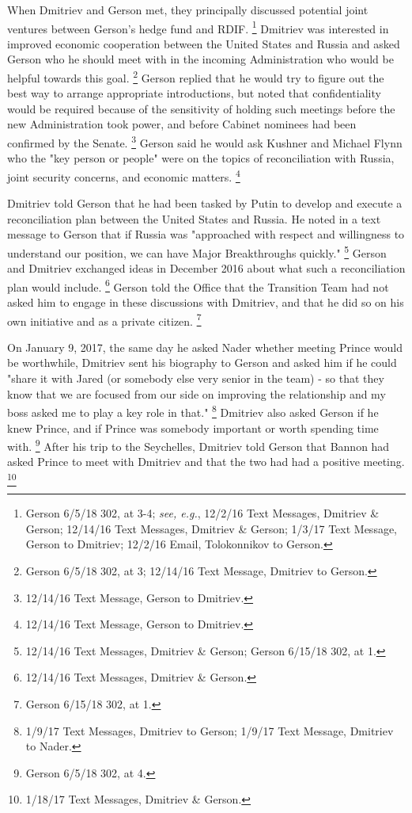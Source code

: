 When Dmitriev and Gerson met, they principally discussed potential joint ventures between Gerson's hedge fund and RDIF.%
\footnote{Gerson 6/5/18 302, at 3-4;
\textit{see, e.g.}, 12/2/16 Text Messages, Dmitriev \& Gerson;
12/14/16 Text Messages, Dmitriev \& Gerson;
1/3/17 Text Message, Gerson to Dmitriev;
12/2/16 Email, Tolokonnikov to Gerson.}
Dmitriev was interested in improved economic cooperation between the United States and Russia and asked Gerson who he should meet with in the incoming Administration who would be helpful towards this goal.%
\footnote{Gerson 6/5/18 302, at 3;
12/14/16 Text Message, Dmitriev to Gerson.}
Gerson replied that he would try to figure out the best way to arrange appropriate introductions, but noted that confidentiality would be required because of the sensitivity of holding such meetings before the new Administration took power, and before Cabinet nominees had been confirmed by the Senate.%
\footnote{12/14/16 Text Message, Gerson to Dmitriev.}
Gerson said he would ask Kushner and Michael Flynn who the "key person or people" were on the topics of reconciliation with Russia, joint security concerns, and economic matters.%
\footnote{12/14/16 Text Message, Gerson to Dmitriev.}

Dmitriev told Gerson that he had been tasked by Putin to develop and execute a reconciliation plan between the United States and Russia.
He noted in a text message to Gerson that if Russia was "approached with respect and willingness to understand our position, we can have Major Breakthroughs quickly."%
\footnote{12/14/16 Text Messages, Dmitriev \& Gerson;
Gerson 6/15/18 302, at 1.}
Gerson and Dmitriev exchanged ideas in December 2016 about what such a reconciliation plan would include.%
\footnote{12/14/16 Text Messages, Dmitriev \& Gerson.}
Gerson told the Office that the Transition Team had not asked him to engage in these discussions with Dmitriev, and that he did so on his own initiative and as a private citizen.%
\footnote{Gerson 6/15/18 302, at 1.}

On January 9, 2017, the same day he asked Nader whether meeting Prince would be worthwhile, Dmitriev sent his biography to Gerson and asked him if he could "share it with Jared (or somebody else very senior in the team) - so that they know that we are focused from our side on improving the relationship and my boss asked me to play a key role in that."%
\footnote{1/9/17 Text Messages, Dmitriev to Gerson;
1/9/17 Text Message, Dmitriev to Nader.}
Dmitriev also asked Gerson if he knew Prince, and if Prince was somebody important or worth spending time with.%
\footnote{Gerson 6/5/18 302, at 4.}
After his trip to the Seychelles, Dmitriev told Gerson that Bannon had asked Prince to meet with Dmitriev and that the two had had a positive meeting.%
\footnote{1/18/17 Text Messages, Dmitriev \& Gerson.}

